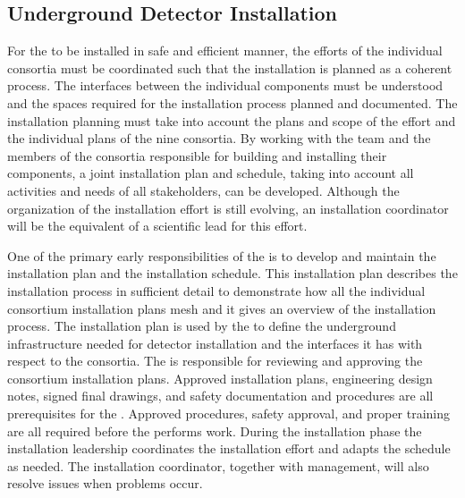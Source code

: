 %

\subsection{Underground Detector Installation}
\label{sec:fdsp-coord-undergd}

For the  to be installed in safe and efficient
manner, the efforts of the individual consortia must be coordinated
such that the installation is planned as a coherent process. The
interfaces between the individual components must be understood
and the spaces required for the installation process planned and
documented. The installation planning must take into account the
plans and scope of the  effort and the individual plans of
the nine consortia. By working with the  team and the
members of the consortia responsible for building and installing their
components, a joint installation plan and schedule, taking into account
all activities and needs of all stakeholders, can be developed. Although
the organization of the installation effort is still evolving, %
an installation coordinator will be the equivalent of a scientific lead for this effort.

One of the primary early responsibilities of the  is to
develop and maintain the  installation plan and the
installation schedule. This installation plan 
describes the installation process in sufficient detail to demonstrate
how all the individual consortium installation plans mesh and it 
gives an overview of the installation process. The installation plan
is used by the  to define the underground infrastructure
needed for detector installation and the interfaces it has with respect  to 
the consortia. The  is responsible for reviewing and
approving the consortium installation plans. Approved installation
plans, engineering design notes, signed final drawings, and safety
documentation and procedures are all prerequisites for the . 
Approved procedures, safety approval, and
proper training are all required before the  performs
work. During the installation phase the installation leadership 
coordinates the  installation effort and adapts the schedule
as needed. The installation coordinator, together with management, will also
resolve issues when problems occur.

